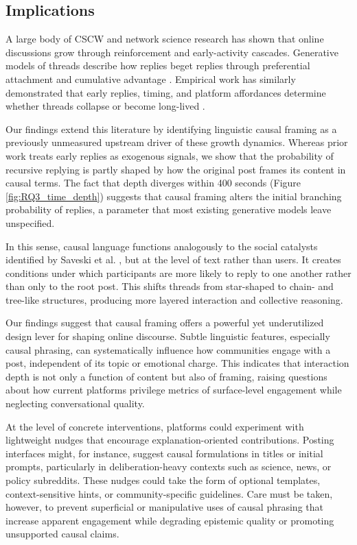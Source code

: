 \documentclass[acmsmall]{acmart}
\begin{document}
\subsection{Implications}


A large body of CSCW and network science research has shown that online discussions grow through reinforcement and early-activity cascades. Generative models of threads describe how replies beget replies through preferential attachment and cumulative advantage \cite{gomez2008statistical, kumar2010dynamics, gomez2013likelihood, medvedev2019modelling}. Empirical work has similarly demonstrated that early replies, timing, and platform affordances determine whether threads collapse or become long-lived \cite{krohn2019modelling, horawalavithana2022online, aragon2017generative, budak2017threading}.


Our findings extend this literature by identifying linguistic causal framing as a previously unmeasured upstream driver of these growth dynamics. Whereas prior work treats early replies as exogenous signals, we show that the probability of recursive replying is partly shaped by how the original post frames its content in causal terms. The fact that depth diverges within 400 seconds (Figure \ref{fig:RQ3_time_depth}) suggests that causal framing alters the initial branching probability of replies, a parameter that most existing generative models leave unspecified.

In this sense, causal language functions analogously to the social catalysts identified by Saveski et al. \cite{saveski2021social}, but at the level of text rather than users. It creates conditions under which participants are more likely to reply to one another rather than only to the root post. This shifts threads from star-shaped to chain- and tree-like structures, producing more layered interaction and collective reasoning.

Our findings suggest that causal framing offers a powerful yet underutilized design lever for shaping online discourse. Subtle linguistic features, especially causal phrasing, can systematically influence how communities engage with a post, independent of its topic or emotional charge. This indicates that interaction depth is not only a function of content but also of framing, raising questions about how current platforms privilege metrics of surface-level engagement while neglecting conversational quality.

At the level of concrete interventions, platforms could experiment with lightweight nudges that encourage explanation-oriented contributions. Posting interfaces might, for instance, suggest causal formulations in titles or initial prompts, particularly in deliberation-heavy contexts such as science, news, or policy subreddits. These nudges could take the form of optional templates, context-sensitive hints, or community-specific guidelines. Care must be taken, however, to prevent superficial or manipulative uses of causal phrasing that increase apparent engagement while degrading epistemic quality or promoting unsupported causal claims.
\end{document}
